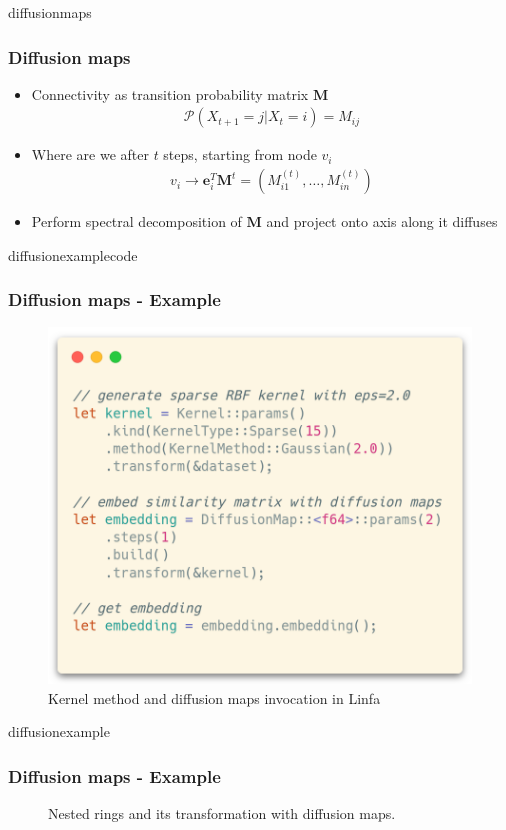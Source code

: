 \documentclass[xcolor=x11names,compress]{beamer}
\begin{document}
\begin{frame}{diffusionmaps}
    \frametitle{Diffusion maps}

    \begin{itemize}
        \item<1-> Connectivity as transition probability matrix $\mathbf{M}$
            \begin{align}
                \mathcal{P}(X_{t+1}=j|X_t=i) = M_{ij}
            \end{align}
        \item<2-> Where are we after $t$ steps, starting from node $v_i$
            \begin{align}
                v_i \to \mathbf{e}_i^T\mathbf{M}^t = (M_{i1}^{(t)},\dots,M_{in}^{(t)})
            \end{align}
        \item<3-> Perform spectral decomposition of $\mathbf{M}$ and project onto axis along it diffuses
    \end{itemize}
\end{frame}

\begin{frame}{diffusionexamplecode}
    \frametitle{Diffusion maps - Example}

    \begin{figure}[ht]
        \centering
        \includegraphics[width=0.5\linewidth]{images/diffusion_code.png}
        \caption{Kernel method and diffusion maps invocation in Linfa}%
    \end{figure}
\end{frame}

\begin{frame}{diffusionexample}
    \frametitle{Diffusion maps - Example}

    \begin{figure}[ht]
        \centering
        \subfloat[Original]{\resizebox{0.45\linewidth}{!}{}}
        \subfloat[Embedded]{\resizebox{0.45\linewidth}{!}{}}
        \caption{Nested rings and its transformation with diffusion maps.}%
    \end{figure}
\end{frame}
\end{document}
